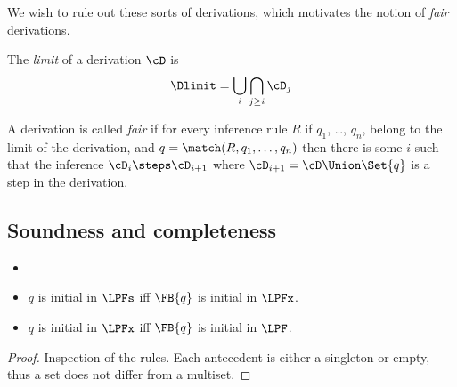 \noindent We wish to rule out these sorts of derivations, which motivates the
notion of \emph{fair} derivations.

\begin{definition}
  The \emph{limit} of a derivation $\cD$ is
  \[
  \Dlimit = \bigcup_i\bigcap_{j\geq i}\cD_j
  \]

  \noindent
  A derivation is called \emph{fair} if for every inference rule $R$
  if $q_1$, \ldots, $q_n$, belong to the limit of the derivation, and
  $q = \match(R, q_1, \ldots, q_n)$ then there is some $i$ such that
  the inference $\cD_i\steps\cD_{i+1}$ where $\cD_{i+1}=\cD\Union\Set{q}$
  is a step in the derivation.
\end{definition}

\subsection{Soundness and completeness}

\begin{lemma}
  \label{prop.thm.initial-same}
  \begin{itemize}
  \item[]
  \item $q$ is initial in $\LPFs$ iff $\FB{q}$ is initial in $\LPFx$.
  \item $q$ is initial in $\LPFx$ iff $\FB{q}$ is initial in $\LPF$.
  \end{itemize}
\end{lemma}

\begin{proof} Inspection of the rules.
  Each antecedent is either a singleton or empty, thus a set does not
  differ from a multiset.
\end{proof}


